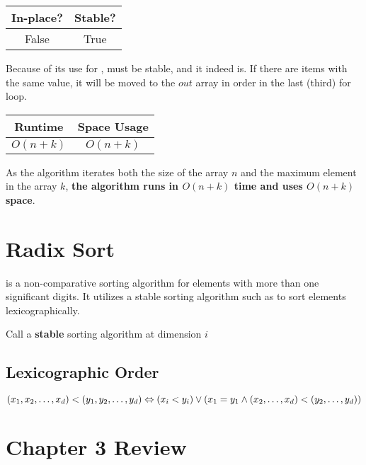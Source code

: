 \begin{center}
  \begin{tabular}{ | c | c | }
    \hline
    In-place? & Stable? \\
    \hline
    False & True \\
    \hline
  \end{tabular}
\end{center}

Because of its use for ,  must be stable, and it indeed is. If there are items with the same value, it will be moved to the $out$ array in order in the last (third) for loop.

\begin{center}
  \begin{tabular}{ | c | c | }
    \hline
    Runtime & Space Usage \\
    \hline
    $O(n + k)$ & $O(n + k)$ \\
    \hline
  \end{tabular}
\end{center}

As the algorithm iterates both the size of the array $n$ and the maximum element in the array $k$, \textbf{the algorithm runs in $O(n + k)$ time and uses $O(n + k)$ space}.

\section{Radix Sort}

 is a non-comparative sorting algorithm for elements with more than one significant digits. It utilizes a stable sorting algorithm such as  to sort elements lexicographically.

\noindent \hrulefill
\begin{algorithmic}[1]
   
      \State Call a \textbf{stable} sorting algorithm at dimension $i$
    \EndFor
    \State {}
  \EndFunction
\end{algorithmic}
\noindent \hrulefill

\subsection{Lexicographic Order}

\[
  (x_1, x_2, \ldots, x_d) < (y_1, y_2, \ldots, y_d) \\
  \Leftrightarrow \\
  (x_i < y_i) \lor (x_1 = y_1 \land (x_2, \ldots, x_d) < (y_2, \ldots, y_d))
\]

\section{Chapter 3 Review}
